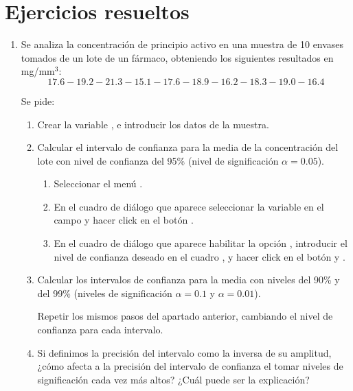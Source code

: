 \section{Ejercicios resueltos}
\begin{enumerate}[leftmargin=*]
\item  Se analiza la concentración de principio activo en una muestra 
de 10 envases tomados de un lote de un fármaco,
obteniendo los siguientes resultados en mg/mm$^{3}$:
\[
17.6-19.2-21.3-15.1-17.6-18.9-16.2-18.3-19.0-16.4
\]

Se pide:
\begin{enumerate}
\item  Crear la variable , e introducir los 
datos de la muestra.
\item  Calcular el intervalo de confianza para la media de la 
concentración del lote con nivel de confianza del 95\%
(nivel de significación $\alpha =0.05$).
\begin{indicacion}
\begin{enumerate}
\item Seleccionar el menú .
\item En el cuadro de diálogo que aparece seleccionar la variable  en el campo
 y hacer click en el botón .
\item En el cuadro de diálogo que aparece habilitar la opción , introducir el nivel
de confianza deseado en el cuadro , y hacer 
click en el botón  y .
\end{enumerate}
\end{indicacion}

\item Calcular los intervalos de confianza para la media con niveles del 90\% y del 99\% (niveles de significación
$\alpha=0.1$ y $\alpha=0.01$).
\begin{indicacion}
Repetir los mismos pasos del apartado anterior, cambiando el nivel de confianza para cada intervalo.
\end{indicacion}

\item  Si definimos la precisión del intervalo como la inversa de su amplitud, ¿cómo afecta a la precisión del
intervalo de confianza el tomar niveles de significación cada vez más altos?
¿Cuál puede ser la explicación?


\end{enumerate}
\end{enumerate}
